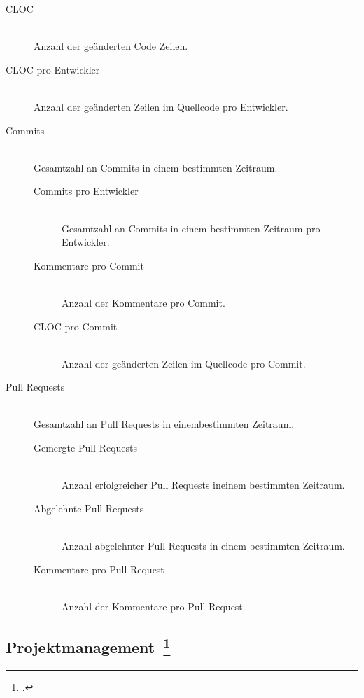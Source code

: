 \begin{description}
  \item[\ac{CLOC}] \hfill \\ Anzahl der geänderten Code Zeilen.
  \item[\ac{CLOC} pro Entwickler] \hfill \\ Anzahl der geänderten Zeilen im Quellcode pro Entwickler.
  \item[Commits] \hfill \\ Gesamtzahl an Commits in einem bestimmten Zeitraum.
  \begin{description}
    \item[Commits pro Entwickler] \hfill \\ Gesamtzahl an Commits in einem bestimmten Zeitraum pro Entwickler.
    \item[Kommentare pro Commit] \hfill \\ Anzahl der Kommentare pro Commit.
    \item[\ac{CLOC} pro Commit] \hfill \\ Anzahl der geänderten Zeilen im Quellcode pro Commit.
  \end{description}
  \item[Pull Requests] \hfill \\ Gesamtzahl an Pull Requests in einembestimmten Zeitraum.
  \begin{description}
    \item[Gemergte Pull Requests] \hfill \\ Anzahl erfolgreicher Pull Requests ineinem bestimmten Zeitraum.
    \item[Abgelehnte Pull Requests] \hfill \\ Anzahl abgelehnter Pull Requests in einem bestimmten Zeitraum.
    \item[Kommentare pro Pull Request] \hfill \\ Anzahl der Kommentare pro Pull Request.
  \end{description}
\end{description}

\newpage
\subsection[Projektmanagement]{Projektmanagement~\footcite[vgl.][S.37ff]{davis_agile_2015}}

